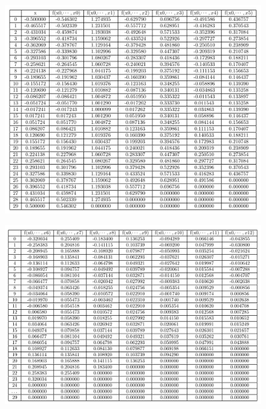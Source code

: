 \documentclass[a4paper, 12pt]{article}
\begin{document}
\begin{figure}[ht]
	\centering
	\includegraphics[width=1\linewidth]{./img/t11.png}
\end{figure}

\begin{figure}[ht]
	\centering
	\includegraphics[width=1\linewidth]{./img/t12.png}
\end{figure}
\end{document}
